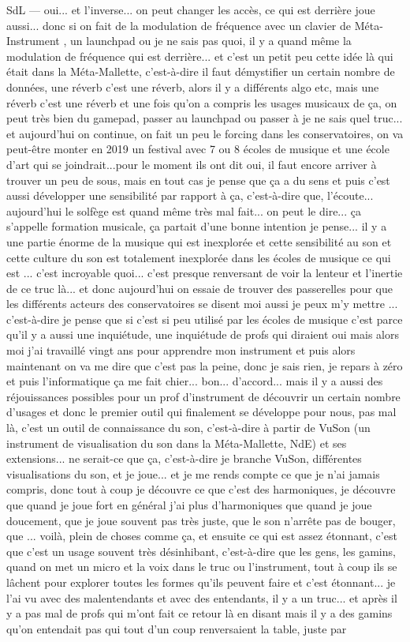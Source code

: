 SdL — oui... et l'inverse... on peut changer les accès, ce qui est derrière joue aussi... donc si on fait de la modulation de fréquence avec un clavier de Méta-Instrument , un launchpad ou je ne sais pas quoi, il y a quand même la modulation de fréquence qui est derrière... et c'est un petit peu cette idée là qui était dans la Méta-Mallette, c'est-à-dire il faut démystifier un certain nombre de données, une réverb c'est une réverb, alors il y a différents algo etc, mais une réverb c'est une réverb et une fois qu'on a compris les usages musicaux de ça, on peut très bien du gamepad, passer au launchpad ou passer à je ne sais quel truc... et aujourd'hui on continue, on fait un peu le forcing dans les conservatoires, on va peut-être monter en 2019 un festival avec 7 ou 8 écoles de musique et une école d'art qui se joindrait...pour le moment ils ont dit oui, il faut encore arriver à trouver un peu de sous, mais en tout cas je pense que ça a du sens et puis c'est aussi développer une sensibilité par rapport à ça, c'est-à-dire que, l'écoute... aujourd'hui le solfège est quand même très mal fait... on peut le dire... ça s'appelle formation musicale, ça partait d'une bonne intention je pense... il y a une partie énorme de la musique qui est inexplorée et cette sensibilité au son et cette culture du son est totalement inexplorée dans les écoles de musique ce qui est ... c'est incroyable quoi... c'est presque renversant de voir la lenteur et l'inertie de ce truc là... et donc aujourd'hui on essaie de trouver des passerelles pour que les différents acteurs des conservatoires se disent moi aussi je peux m'y mettre ... c'est-à-dire je pense que si c'est si peu utilisé par les écoles de musique c'est parce qu'il y a aussi une inquiétude, une inquiétude de profs qui diraient oui mais alors moi j'ai travaillé vingt ans pour apprendre mon instrument et puis alors maintenant on va me dire que c'est pas la peine, donc je sais rien, je repars à zéro et puis l'informatique ça me fait chier... bon... d'accord... mais il y a aussi des réjouissances possibles pour un prof d'instrument de découvrir un certain nombre d'usages et donc le premier outil qui finalement se développe pour nous, pas mal là, c'est un outil de connaissance du son, c'est-à-dire à partir de VuSon (un instrument de visualisation du son dans la Méta-Mallette, NdE) et ses extensions... ne serait-ce que ça, c'est-à-dire je branche VuSon, différentes visualisations du son, et je joue... et je me rends compte ce que je n'ai jamais compris, donc tout à coup je découvre ce que c'est des harmoniques, je découvre que quand je joue fort en général j'ai plus d'harmoniques que quand je joue doucement, que je joue souvent pas très juste, que le son n'arrête pas de bouger, que ... voilà, plein de choses comme ça, et ensuite ce qui est assez étonnant, c'est que c'est un usage souvent très désinhibant, c'est-à-dire que les gens, les gamins, quand on met un micro et la voix dans le truc ou l'instrument, tout à coup ils se lâchent pour explorer toutes les formes qu'ils peuvent faire et c'est étonnant... je l'ai vu avec des malentendants et avec des entendants, il y a un truc... et après il y a pas mal de profs qui m'ont fait ce retour là en disant mais il y a des gamins qu'on entendait pas qui tout d'un coup renversaient la table, juste par 